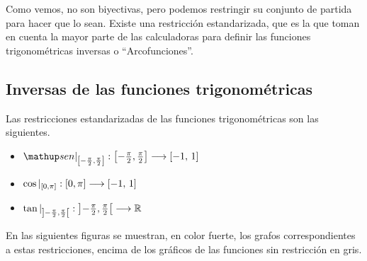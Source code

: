 Como vemos, no son biyectivas, pero podemos restringir su conjunto de partida para hacer que lo sean.
Existe una restricción estandarizada, que es la que toman en cuenta la mayor parte de las calculadoras para definir las funciones trigonométricas inversas o ``Arcofunciones''.

\subsection{Inversas de las funciones trigonom\'etricas}

Las restricciones estandarizadas de las funciones trigonométricas son las siguientes.
\begin{itemize}
\item $\sen|_{\left[-\frac{\pi}{2},\frac{\pi}{2}\right]} : \left[-\frac{\pi}{2},\frac{\pi}{2}\right] \To [-1,\,1]$
\item $\cos|_{\left[0,\pi\right]} : \left[0,\pi\right] \longrightarrow [-1,\,1]$
\item $\tan|_{\left]-\frac{\pi}{2},\frac{\pi}{2}\right[} : \left]-\frac{\pi}{2},\frac{\pi}{2}\right[ \longrightarrow \mathbb{R}$
\end{itemize}

En las siguientes figuras se muestran, en color fuerte, los grafos correspondientes a estas restricciones, encima de los gráficos de las funciones sin restricción en gris.


